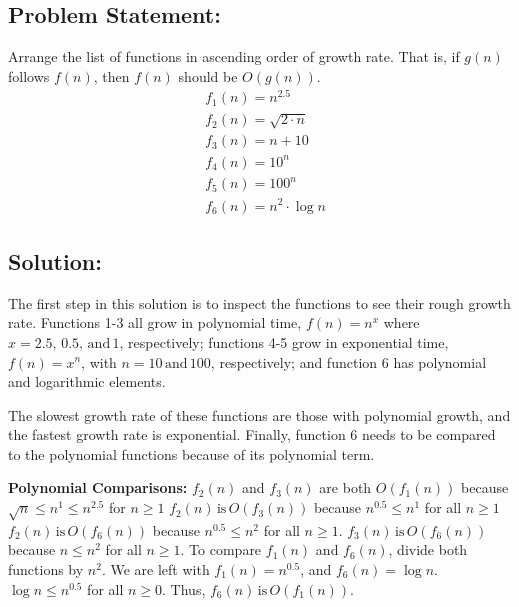 \documentclass{article}
\newcommand{\tab}[1][1]{\noindent \hspace{#1cm} }
\begin{document}
\subsection*{Problem Statement:}
Arrange the list of functions in ascending order of growth rate.  That is, if $g(n)$ follows $f(n)$, then $f(n)$ should be $O(g(n))$.
\begin{align*}
&f_1(n) = n^{2.5} \\
&f_2(n) = \sqrt{2 \cdot n} \\
&f_3(n) = n + 10 \\
&f_4(n) = 10^n \\
&f_5(n) = 100^n \\
&f_6(n) = n^2 \cdot \log{n}
\end{align*}

\subsection*{Solution:}
The first step in this solution is to inspect the functions to see their rough growth rate.
Functions 1-3 all grow in polynomial time, $f(n) = n^x$ where $x = 2.5,\, 0.5, \,\mathrm{and} \, 1$, respectively; functions 4-5 grow in exponential time, $f(n) = x^n$, with $n = 10 \,\mathrm{and} \, 100$, respectively; and function 6 has polynomial and logarithmic elements.

\noindent The slowest growth rate of these functions are those with polynomial growth, and the fastest growth rate is exponential.  Finally, function 6 needs to be compared to the polynomial functions because of its polynomial term.  
\newline

\noindent\textbf{Polynomial Comparisons:}
\newline \tab $f_2(n)$ and $f_3(n)$ are both $O(f_1(n))$ because $\sqrt{n} \leq n^1 \leq n^{2.5}$ for $n \geq 1$
\newline \tab $f_2(n) \mathrm{\,is\,}O( f_3(n))$ because $n^{0.5} \leq n^1$ for all $n \geq 1$
\newline \tab $f_2(n) \mathrm{\,is\,} O( f_6(n))$ because $n^{0.5} \leq n^2$ for all $n \geq 1$. 
\newline \tab $f_3(n) \mathrm{\,is\,} O( f_6(n))$ because $n \leq n^2$ for all $n \geq 1$.  
\newline \newline To compare $f_1(n)$ and $f_6(n)$, divide both functions by $n^2$.  We are left with $f_1(n) = n^{0.5}$, and $f_6(n) = \log{n}$.  $\log{n} \leq n^{0.5}$ for all $n \geq 0$.  Thus, $f_6(n) \mathrm{\,is\,} O( f_1(n))$.
\end{document}
